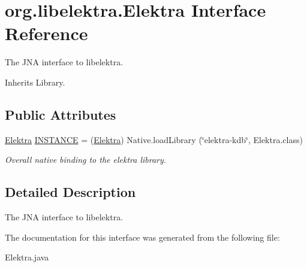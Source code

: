 \hypertarget{interfaceorg_1_1libelektra_1_1Elektra}{}\section{org.\+libelektra.\+Elektra Interface Reference}
\label{interfaceorg_1_1libelektra_1_1Elektra}


The J\+NA interface to libelektra.  




Inherits Library.

\subsection*{Public Attributes}
\begin{DoxyCompactItemize}
\item 
\mbox{\label{interfaceorg_1_1libelektra_1_1Elektra_a5a69a68a26ccec272c0f992f0a94a4cc}} 
\mbox{\hyperlink{interfaceorg_1_1libelektra_1_1Elektra}{Elektra}} \mbox{\hyperlink{interfaceorg_1_1libelektra_1_1Elektra_a5a69a68a26ccec272c0f992f0a94a4cc}{I\+N\+S\+T\+A\+N\+CE}} = (\mbox{\hyperlink{interfaceorg_1_1libelektra_1_1Elektra}{Elektra}}) Native.\+load\+Library (\char`\"{}elektra-\/kdb\char`\"{}, Elektra.\+class)
\begin{DoxyCompactList}\small\item\em Overall native binding to the elektra library. \end{DoxyCompactList}\end{DoxyCompactItemize}


\subsection{Detailed Description}
The J\+NA interface to libelektra. 

The documentation for this interface was generated from the following file\+:\begin{DoxyCompactItemize}
\item 
Elektra.\+java\end{DoxyCompactItemize}
